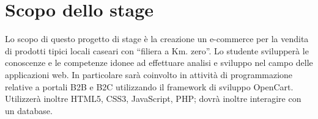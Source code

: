 \section*{Scopo dello stage}
Lo scopo di questo progetto di stage è la creazione un e-commerce per la vendita di prodotti tipici locali caseari con “filiera a Km. zero”.
Lo studente svilupperà le conoscenze e le competenze idonee ad effettuare analisi e sviluppo nel campo delle applicazioni web. In particolare sarà coinvolto in attività di programmazione relative a portali B2B e B2C utilizzando il framework di sviluppo OpenCart. Utilizzerà inoltre HTML5, CSS3, JavaScript, PHP; dovrà inoltre interagire con un database.